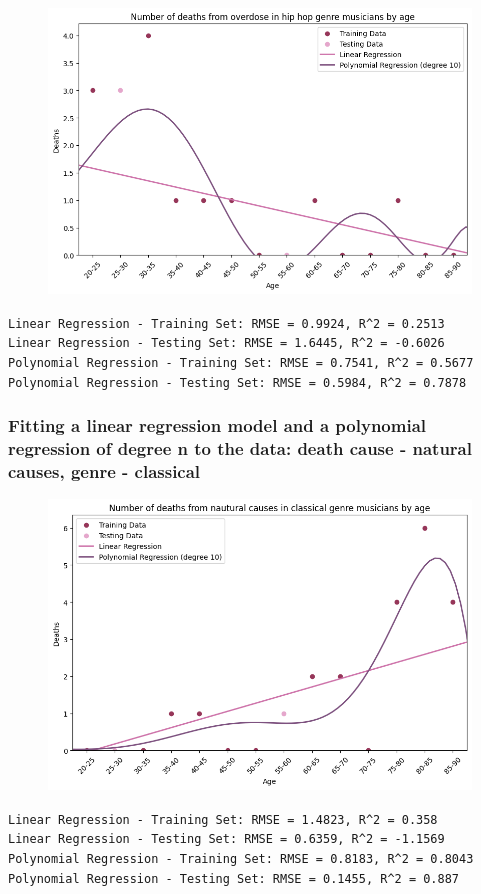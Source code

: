 \documentclass{article}
\begin{document}
\begin{figure} [H]
    \centering
    \includegraphics[width=0.6\linewidth]{graph_images/experiments/exp3.png}
    \label{fig:enter-label}
\end{figure}

\noindent\texttt{Linear Regression - Training Set: RMSE = 0.9924, R\textasciicircum2 = 0.2513\\
Linear Regression - Testing Set: RMSE = 1.6445, R\textasciicircum2 = -0.6026\\
Polynomial Regression - Training Set: RMSE = 0.7541, R\textasciicircum2 = 0.5677\\
Polynomial Regression - Testing Set: RMSE = 0.5984, R\textasciicircum2 = 0.7878\\}



\subsubsection{Fitting a linear regression model and a polynomial regression of degree n to the data: death cause - natural causes, genre - classical}

\begin{figure} [H]
    \centering
    \includegraphics[width=0.6\linewidth]{graph_images/experiments/exp4.png}
    \label{fig:enter-label}
\end{figure}

\noindent\texttt{Linear Regression - Training Set: RMSE = 1.4823, R\textasciicircum2 = 0.358\\
Linear Regression - Testing Set: RMSE = 0.6359, R\textasciicircum2 = -1.1569\\
Polynomial Regression - Training Set: RMSE = 0.8183, R\textasciicircum2 = 0.8043\\
Polynomial Regression - Testing Set: RMSE = 0.1455, R\textasciicircum2 = 0.887\\}
\end{document}
